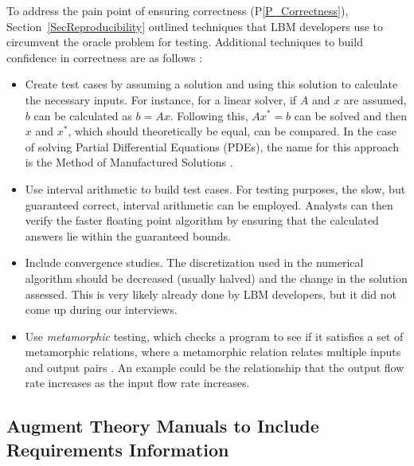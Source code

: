 \documentclass[final, 3p, times, authoryear]{elsarticle}
\newcommand{\ppref}[1]{P\ref{#1}}
\begin{document}
To address the pain point of ensuring correctness (\ppref{P_Correctness}),
Section~\ref{SecReproducibility} outlined techniques that LBM developers use to
circumvent the oracle problem for testing.  Additional techniques to build
confidence in correctness are as follows \citep{Smith2016}: 

\begin{itemize}

\item Create test cases by assuming a solution and using this solution to
  calculate the necessary inputs.  For instance, for a linear solver, if $A$ and
  $x$ are assumed, $b$ can be calculated as $b = A x$.  Following this, $A x^* =
  b$ can be solved and then $x$ and $x^*$, which should theoretically be equal,
  can be compared.  In the case of solving Partial Differential Equations
  (PDEs), the name for this approach is the Method of Manufactured Solutions
  \citep{Roache1998}.
\item Use interval arithmetic to build test cases.  For testing purposes, the
  slow, but guaranteed correct, interval arithmetic \citep{Hickey2001} can be
  employed. Analysts can then verify the faster floating point algorithm by
  ensuring that the calculated answers lie within the guaranteed bounds.
\item Include convergence studies.  The discretization used in the numerical
  algorithm should be decreased (usually halved) and the change in the solution
  assessed.  This is very likely already done by LBM developers, but it did not
  come up during our interviews.
\item Use \emph{metamorphic} testing, which checks a program to see if it
  satisfies a set of metamorphic relations, where a metamorphic relation relates
  multiple inputs and output pairs \citep{KanewalaAndLundgren2016}.  An example
  could be the relationship that the output flow rate increases as the input
  flow rate increases.
\end{itemize}

\subsection{Augment Theory Manuals to Include Requirements Information} \label{Sec_AugTheoryMans}
\end{document}
